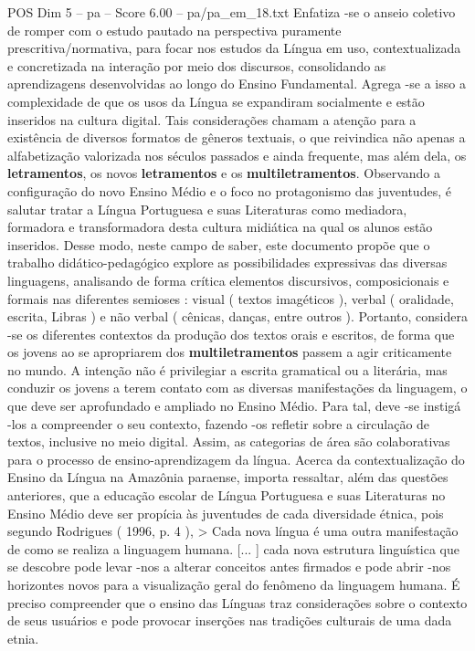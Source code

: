 \begin{textsample}{POS Dim 5 – pa – Score 6.00 – pa/pa\_em\_18.txt}
Enfatiza -se o anseio coletivo de romper com o estudo pautado na perspectiva puramente prescritiva/normativa, para focar nos estudos da Língua em uso, contextualizada e concretizada na interação por meio dos discursos, consolidando as aprendizagens desenvolvidas ao longo do Ensino Fundamental.
Agrega -se a isso a complexidade de que os usos da Língua se expandiram socialmente e estão inseridos na cultura digital.
Tais considerações chamam a atenção para a existência de diversos formatos de gêneros textuais, o que reivindica não apenas a alfabetização valorizada nos séculos passados e ainda frequente, mas além dela, os \textbf{letramentos}, os novos \textbf{letramentos} e os \textbf{multiletramentos}.
Observando a configuração do novo Ensino Médio e o foco no protagonismo das juventudes, é salutar tratar a Língua Portuguesa e suas Literaturas como mediadora, formadora e transformadora desta cultura midiática na qual os alunos estão inseridos.
Desse modo, neste campo de saber, este documento propõe que o trabalho didático-pedagógico explore as possibilidades expressivas das diversas linguagens, analisando de forma crítica elementos discursivos, composicionais e formais nas diferentes semioses : visual ( textos imagéticos ), verbal ( oralidade, escrita, Libras ) e não verbal ( cênicas, danças, entre outros ).
Portanto, considera -se os diferentes contextos da produção dos textos orais e escritos, de forma que os jovens ao se apropriarem dos \textbf{multiletramentos} passem a agir criticamente no mundo.
A intenção não é privilegiar a escrita gramatical ou a literária, mas conduzir os jovens a terem contato com as diversas manifestações da linguagem, o que deve ser aprofundado e ampliado no Ensino Médio.
Para tal, deve -se instigá -los a compreender o seu contexto, fazendo -os refletir sobre a circulação de textos, inclusive no meio digital.
Assim, as categorias de área são colaborativas para o processo de ensino-aprendizagem da língua.
Acerca da contextualização do Ensino da Língua na Amazônia paraense, importa ressaltar, além das questões anteriores, que a educação escolar de Língua Portuguesa e suas Literaturas no Ensino Médio deve ser propícia às juventudes de cada diversidade étnica, pois segundo Rodrigues ( 1996, p. 4 ), > Cada nova língua é uma outra manifestação de como se realiza a linguagem humana. [... ] cada nova estrutura linguística que se descobre pode levar -nos a alterar conceitos antes firmados e pode abrir -nos horizontes novos para a visualização geral do fenômeno da linguagem humana.
É preciso compreender que o ensino das Línguas traz considerações sobre o contexto de seus usuários e pode provocar inserções nas tradições culturais de uma dada etnia.

\end{textsample}
